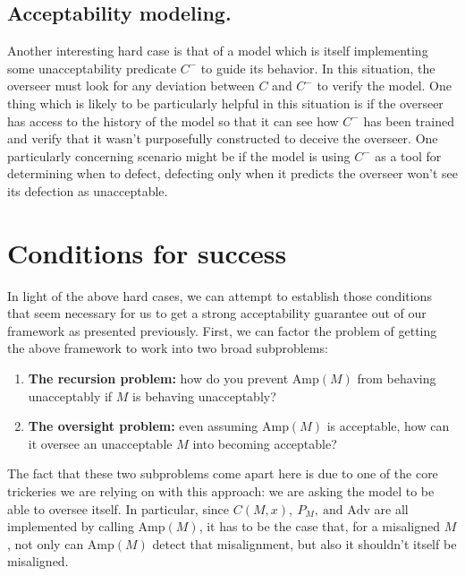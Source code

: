 \documentclass{amsart}
\begin{document}
\subsection{Acceptability modeling.} Another interesting hard case is that of a model which is itself implementing some unacceptability predicate $C^-$ to guide its behavior. In this situation, the overseer must look for any deviation between $C$ and $C^-$ to verify the model. One thing which is likely to be particularly helpful in this situation is if the overseer has access to the history of the model so that it can see how $C^-$ has been trained and verify that it wasn't purposefully constructed to deceive the overseer. One particularly concerning scenario might be if the model is using $C^-$ as a tool for determining when to defect, defecting only when it predicts the overseer won't see its defection as unacceptable.

\section{Conditions for success}

In light of the above hard cases, we can attempt to establish those conditions that seem necessary for us to get a strong acceptability guarantee out of our framework as presented previously. First, we can factor the problem of getting the above framework to work into two broad subproblems:
\begin{enumerate}
    \item \textbf{The recursion problem:} how do you prevent $\text{Amp}(M)$ from behaving unacceptably if $M$ is behaving unacceptably?
    \item \textbf{The oversight problem:} even assuming $\text{Amp}(M)$ is acceptable, how can it oversee an unacceptable $M$ into becoming acceptable?
\end{enumerate}
The fact that these two subproblems come apart here is due to one of the core trickeries we are relying on with this approach: we are asking the model to be able to oversee itself. In particular, since $C(M, x),~ P_M,~ \text{and Adv}$ are all implemented by calling $\text{Amp}(M)$, it has to be the case that, for a misaligned $M$, not only can $\text{Amp}(M)$ detect that misalignment, but also it shouldn't itself be misaligned.
\end{document}
